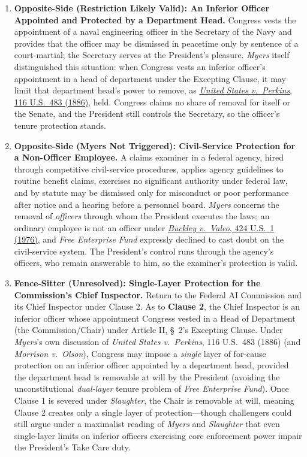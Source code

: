 \documentclass[12pt]{article}
\begin{document}
\begin{enumerate}
\item \textbf{Opposite-Side (Restriction Likely Valid): An Inferior Officer Appointed and Protected by a Department Head.} Congress vests the appointment of a naval engineering officer in the Secretary of the Navy and provides that the officer may be dismissed in peacetime only by sentence of a court-martial; the Secretary serves at the President's pleasure. \textit{Myers} itself distinguished this situation: when Congress vests an inferior officer's appointment in a head of department under the Excepting Clause, it may limit that department head's power to remove, as \href{https://supreme.justia.com/cases/federal/us/116/483/}{\textit{United States v.\ Perkins}, 116 U.S.\ 483 (1886)}, held. Congress claims no share of removal for itself or the Senate, and the President still controls the Secretary, so the officer's tenure protection stands.

\item \textbf{Opposite-Side (Myers Not Triggered): Civil-Service Protection for a Non-Officer Employee.} A claims examiner in a federal agency, hired through competitive civil-service procedures, applies agency guidelines to routine benefit claims, exercises no significant authority under federal law, and by statute may be dismissed only for misconduct or poor performance after notice and a hearing before a personnel board. \textit{Myers} concerns the removal of \emph{officers} through whom the President executes the laws; an ordinary employee is not an officer under \href{https://supreme.justia.com/cases/federal/us/424/1/}{\textit{Buckley v.\ Valeo}, 424 U.S.\ 1 (1976)}, and \textit{Free Enterprise Fund} expressly declined to cast doubt on the civil-service system. The President's control runs through the agency's officers, who remain answerable to him, so the examiner's protection is valid.

\item \textbf{Fence-Sitter (Unresolved): Single-Layer Protection for the Commission's Chief Inspector.} Return to the Federal AI Commission and its Chief Inspector under Clause 2. As to \textbf{Clause 2}, the Chief Inspector is an inferior officer whose appointment Congress vested in a Head of Department (the Commission/Chair) under Article II, \S~2's Excepting Clause. Under \textit{Myers}'s own discussion of \textit{United States v.\ Perkins}, 116 U.S.\ 483 (1886) (and \textit{Morrison v.\ Olson}), Congress may impose a \emph{single} layer of for-cause protection on an inferior officer appointed by a department head, provided the department head is removable at will by the President (avoiding the unconstitutional \emph{dual-layer} tenure problem of \textit{Free Enterprise Fund}). Once Clause 1 is severed under \textit{Slaughter}, the Chair is removable at will, meaning Clause 2 creates only a single layer of protection---though challengers could still argue under a maximalist reading of \textit{Myers} and \textit{Slaughter} that even single-layer limits on inferior officers exercising core enforcement power impair the President's Take Care duty.

\end{enumerate}
\end{document}
